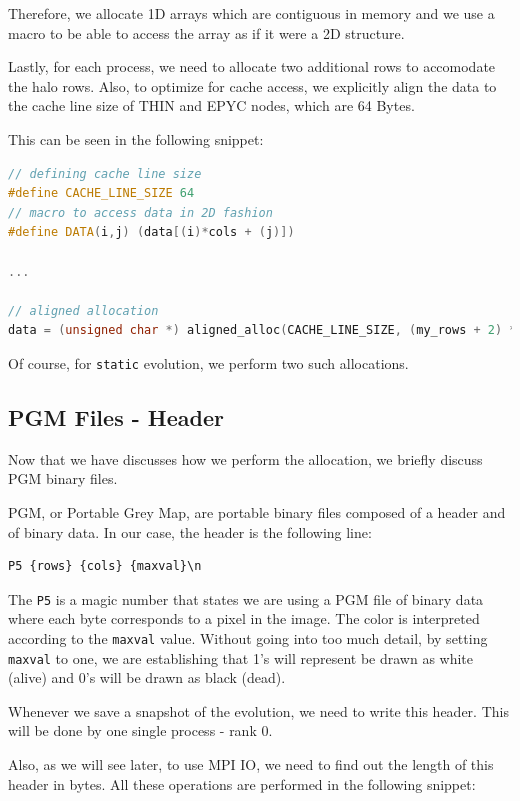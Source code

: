\documentclass{report}
\begin{document}
Therefore, we allocate 1D arrays which are contiguous in memory and we use 
a macro to be able to access the array as if it were a 2D structure. 

Lastly, for each process, we need to allocate two additional rows to accomodate 
the halo rows. Also, to optimize for cache access, we explicitly align the data 
to the cache line size of THIN and EPYC nodes, which are 64 Bytes.

This can be seen in the following snippet:

\begin{lstlisting}[language=C++]
// defining cache line size
#define CACHE_LINE_SIZE 64
// macro to access data in 2D fashion
#define DATA(i,j) (data[(i)*cols + (j)])

... 

// aligned allocation
data = (unsigned char *) aligned_alloc(CACHE_LINE_SIZE, (my_rows + 2) * cols);
\end{lstlisting}

Of course, for \texttt{static} evolution, we perform two such allocations.

\subsection{PGM Files - Header}

Now that we have discusses how we perform the allocation, we briefly discuss 
PGM binary files. 

PGM, or Portable Grey Map, are portable binary files composed of a header and 
of binary data. In our case, the header is the following line: 

\begin{verbatim}
P5 {rows} {cols} {maxval}\n
\end{verbatim}

The \texttt{P5} is a magic number that states we are using a PGM file of binary 
data where each byte corresponds to a pixel in the image. The color 
is interpreted according to the \texttt{maxval} value. Without going 
into too much detail, by setting \texttt{maxval} to one, we are establishing that 
1's will represent be drawn as white (alive) and 0's will be drawn as black 
(dead).

Whenever we save a snapshot of the evolution, we need to write this header. 
This will be done by one single process - rank 0. 

Also, as we will see later, to use MPI IO, we need to find out the length of 
this header in bytes. All these operations are performed in the following snippet:
\end{document}
